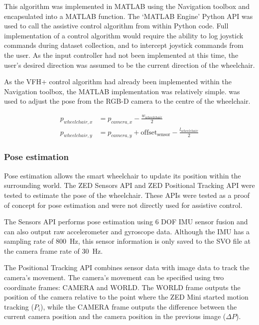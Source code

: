 This algorithm was implemented in MATLAB using the Navigation toolbox and encapsulated into a MATLAB function.
The `MATLAB Engine' Python API was used to call the assistive control algorithm from within Python code.
Full implementation of a control algorithm would require the ability to log joystick commands during
dataset collection, and to intercept joystick commands from the user. As the input controller had not
been implemented at this time, the user's desired direction was assumed to be the current direction
of the wheelchair.

As the VFH+ control algorithm had already been implemented within the Navigation toolbox,
the MATLAB implementation was relatively simple.  was used to adjust
the pose from the RGB-D camera to the centre of the wheelchair.

\begin{equation}
\begin{split}
p_{wheelchair,x} &= p_{camera,x} - \frac{w_{wheelchair}}{2}\\
p_{wheelchair,y} &= p_{camera,y} + \mathrm{offset_{sensor}} - \frac{l_{wheelchair}}{2}
\end{split}
\label{eq:pose_adjustment}
\end{equation}

\subsubsection{Pose estimation}
Pose estimation allows the smart wheelchair to update its position within the surrounding world.
The ZED Sensors API and ZED Positional Tracking API were tested to estimate the pose of the wheelchair.
These APIs were tested as a proof of concept for pose estimation and were not directly used
for assistive control.

\pagebreak
The Sensors API performs pose estimation using 6 DOF IMU sensor fusion and can also output raw accelerometer
and gyroscope data. Although the IMU has a sampling rate of \SI{800}{\hertz}, this sensor information
is only saved to the SVO file at the camera frame rate of \SI{30}{\hertz}.

The Positional Tracking API combines sensor data with image data to track the camera's movement.
The camera's movement can be specified using two coordinate frames: CAMERA and WORLD.
The WORLD frame outputs the position of the camera relative to the point where the ZED Mini started
motion tracking ($P_i$), while the CAMERA frame outputs the difference between the current camera position and
the camera position in the previous image ($\Delta P$).

